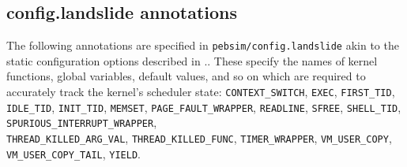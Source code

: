 
\subsection{config.landslide annotations}
\label{sec:landslide-config-landslide}

The following annotations are specified in {\tt pebsim/config.landslide} akin to the static configuration options
described in \sect{\ref{sec:landslide-directly}}..
These specify the names of kernel functions, global variables, default values, and so on
which are required to accurately track the kernel's scheduler state:
{\tt CONTEXT\_SWITCH},
{\tt EXEC},
{\tt FIRST\_TID},
{\tt IDLE\_TID},
{\tt INIT\_TID},
{\tt MEMSET},
{\tt PAGE\_FAULT\_WRAPPER},
{\tt READLINE},
{\tt SFREE},
{\tt SHELL\_TID},
{\tt SPURIOUS\_INTERRUPT\_WRAPPER},
\\
{\tt THREAD\_KILLED\_ARG\_VAL},
{\tt THREAD\_KILLED\_FUNC},
{\tt TIMER\_WRAPPER},
{\tt VM\_USER\_COPY},
\\
{\tt VM\_USER\_COPY\_TAIL},
{\tt YIELD}.

